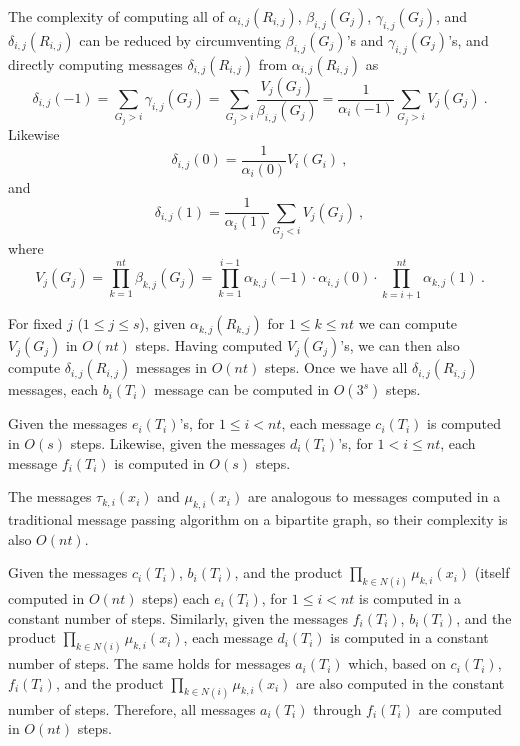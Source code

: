 {The complexity of computing all of $\alpha_{i,j}(R_{i,j})$,
$\beta_{i,j}(G_j)$, $\gamma_{i,j}(G_j)$, and $\delta_{i,j}(R_{i,j})$
can be reduced by  circumventing $\beta_{i,j}(G_j)$'s and
$\gamma_{i,j}(G_j)$'s, and directly computing messages
$\delta_{i,j}(R_{i,j})$ from $\alpha_{i,j}(R_{i,j})$ as
\begin{equation}
\delta_{i,j}(-1)=\sum_{G_j>i} \gamma_{i,j}(G_j) =\sum_{G_j>i}
\frac{V_j(G_j)}{\beta_{i,j}(G_j)}=\frac{1}{\alpha_i(-1)}\sum_{G_j>i}V_j(G_j)~.
\end{equation}
Likewise
\begin{equation}
\delta_{i,j}(0)=\frac{1}{\alpha_i(0)}V_i(G_i)~,
\end{equation}
and
\begin{equation}
\delta_{i,j}(1)=\frac{1}{\alpha_i(1)}\sum_{G_j<i}V_j(G_j)~,
\end{equation}
where
\begin{equation}
V_j(G_j)=\prod_{k=1}^{nt} \beta_{k,j}(G_j) = \prod_{k=1}^{i-1}
\alpha_{k,j}(-1) \cdot  \alpha_{i,j}(0) \cdot \prod_{k=i+1}^{nt}
\alpha_{k,j}(1)~.
\end{equation}

For fixed $j$ ($1 \leq j \leq s$), given $\alpha_{k,j}(R_{k,j})$ for
$1\leq k \leq nt$ we can compute $V_j(G_j)$ in $O(nt)$ steps. Having
computed $V_j(G_j)$'s, we can then also compute
$\delta_{i,j}(R_{i,j})$ messages in $O(nt)$ steps. Once we  have all
$\delta_{i,j}(R_{i,j})$ messages, each $b_i(T_i)$ message can be
computed in $O(3^s)$ steps.

Given the messages $e_i(T_i)$'s, for $1 \leq i < nt$, each message
$c_i(T_i)$ is computed in $O(s)$ steps. Likewise, given the messages
$d_i(T_i)$'s, for $1 < i \leq nt$, each message $f_i(T_i)$ is
computed in $O(s)$ steps.


The messages $\tau_{k,i}(x_i)$ and $\mu_{k,i}(x_i)$ are analogous to
messages computed in a traditional message passing algorithm on a
bipartite graph, so their complexity is also $O(nt)$.

Given the messages $c_i(T_i)$, $b_i(T_i)$, and the product $\prod_{k
\in N(i)} \mu_{k,i}(x_i)$ (itself computed in $O(nt)$ steps) each
$e_i(T_i)$, for $1 \leq i < nt$ is computed in a constant number of
steps. Similarly, given the messages $f_i(T_i)$, $b_i(T_i)$, and the
product $\prod_{k \in N(i)} \mu_{k,i}(x_i)$,  each message
$d_i(T_i)$ is computed in a constant number of steps. The same holds
for messages $a_i(T_i)$ which, based on  $c_i(T_i)$, $f_i(T_i)$, and
the product $\prod_{k \in N(i)} \mu_{k,i}(x_i)$ are also computed in
the constant number of steps. Therefore, all messages $a_i(T_i)$
through $f_i(T_i)$ are computed in $O(nt)$ steps.

}
